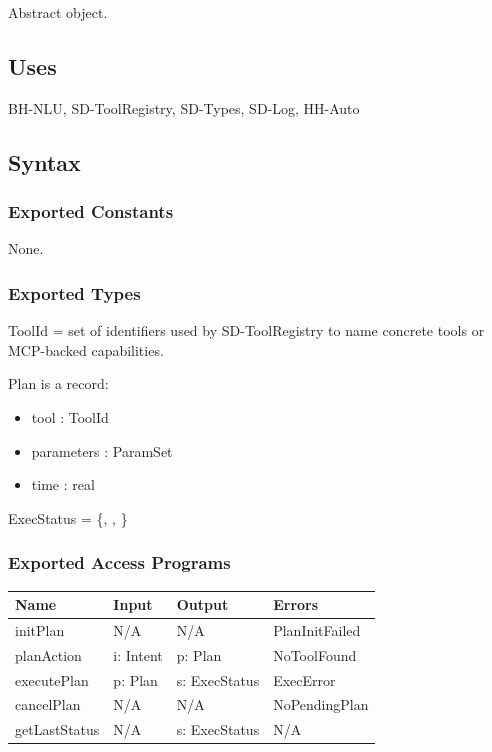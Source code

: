 \documentclass[12pt, titlepage]{article}
\begin{document}
Abstract object.

\subsection{Uses}

BH-NLU, SD-ToolRegistry, SD-Types, SD-Log, HH-Auto

\subsection{Syntax}

\subsubsection{Exported Constants}

None.

\subsubsection{Exported Types}

\noindent
ToolId = set of identifiers used by SD-ToolRegistry to name concrete tools or
MCP-backed capabilities.

\noindent
Plan is a record:
\begin{itemize}
  \item tool : ToolId
  \item parameters : ParamSet
  \item time : real
\end{itemize}

\noindent
ExecStatus = \{, , \}

\subsubsection{Exported Access Programs}

\begin{center}
\begin{tabular}{p{2.7cm} p{4cm} p{4cm} p{2.5cm}}
\hline
\textbf{Name} & \textbf{Input} & \textbf{Output} & \textbf{Errors} \\
\hline
initPlan & N/A & N/A & PlanInitFailed \\
planAction & i: Intent & p: Plan & NoToolFound \\
executePlan & p: Plan & s: ExecStatus & ExecError \\
cancelPlan & N/A & N/A & NoPendingPlan \\
getLastStatus & N/A & s: ExecStatus & N/A \\
\hline
\end{tabular}
\end{center}
\end{document}
